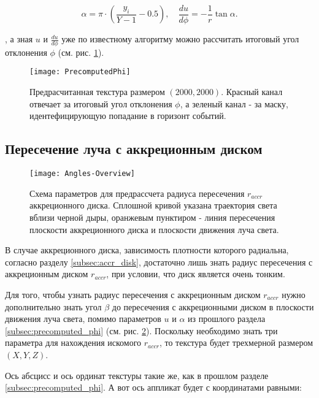 \begin{equation}
\label{eq:precompute_alpha}
    \alpha = \pi\cdot\left(\frac{y_i}{Y - 1} - 0.5\right),
    \quad
    \frac{du}{d\phi} = -\frac{1}{r}\tan{\alpha}.
\end{equation}

, а зная $u$ и $\frac{du}{d\phi}$ уже по известному алгоритму можно рассчитать итоговый угол отклонения $\phi$ (см. рис. \ref{fig:precomputed_phi}).

\begin{figure}[h]
    \centering
    \texttt{[image: PrecomputedPhi]}
    \caption{Предрасчитанная текстура размером $(2000, 2000)$. Красный канал отвечает за итоговый угол отклонения $\phi$, а зеленый канал - за маску, идентефицирующую попадание в горизонт событий.}
    \label{fig:precomputed_phi}
\end{figure}

\newpage

\subsection{Пересечение луча с аккреционным диском}

\begin{figure}[h]
    \centering
    \texttt{[image: Angles-Overview]}
    \caption{Схема параметров для предрассчета радиуса пересечения $r_{accr}$ аккреционного диска. Сплошной кривой указана траектория света вблизи черной дыры, оранжевым пунктиром - линия пересечения плоскости аккреционного диска и плоскости движения луча света.}
    \label{fig:angle_overview}
\end{figure}

В случае аккреционного диска, зависимость плотности которого радиальна, согласно разделу \ref{subsec:accr_disk}, достаточно лишь знать радиус пересечения с аккреционным диском $r_{accr}$, при условии, что диск является очень тонким.

Для того, чтобы узнать радиус пересечения с аккреционным диском $r_{accr}$ нужно дополнительно знать угол $\beta$ до пересечения с аккреционными диском в плоскости движения луча света, помимо параметров $u$ и $\alpha$ из прошлого раздела \ref{subsec:precomputed_phi} (см. рис. \ref{fig:angle_overview}). Поскольку необходимо знать три параметра для нахождения искомого $r_{accr}$, то текстура будет трехмерной размером $(X, Y, Z)$.

Ось абсцисс и ось ординат текстуры такие же, как в прошлом разделе \ref{subsec:precomputed_phi}. А вот ось аппликат будет с координатами равными:

